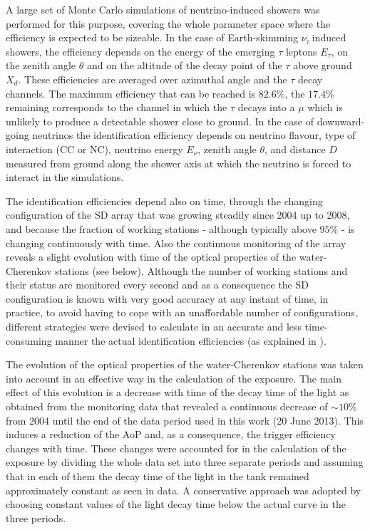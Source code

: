 \documentclass[reprint,showpacs,showkeys,amsmath,amssymb,aps,nofootinbib]{revtex4-1}
\def \nutau {$\nu_\tau~$}
\begin{document}
A large set of Monte Carlo simulations of neutrino-induced
showers was performed for this purpose, covering the whole
parameter space where the efficiency is expected to be sizeable.
In the case of Earth-skimming \nutau induced showers, 
the efficiency depends on the energy of the 
emerging $\tau$ leptons $E_\tau$, on the zenith angle $\theta$ and on the altitude of the
decay point of the $\tau$ above ground $X_d$. These efficiencies are averaged over azimuthal 
angle and the $\tau$ decay channels. 
The maximum efficiency that can be reached
is $82.6\%$, the $17.4\%$ remaining corresponds to the channel 
in which the $\tau$ decays into a $\mu$ which is unlikely to 
produce a detectable shower close to ground. 
In the case of downward-going neutrinos the identification efficiency
depends on neutrino flavour, type of interaction (CC or NC), neutrino 
energy $E_\nu$, zenith angle $\theta$, and distance $D$ measured
from ground along the shower axis at which the neutrino is forced to interact
in the simulations.

The identification efficiencies depend also on time, through the changing configuration 
of the SD array that was growing steadily since 2004 up to 2008, and because  
the fraction of working stations - although typically 
above $95\%$ - is changing continuously with time.
Also the continuous monitoring of the array reveals
a slight evolution with time of the optical properties of 
the water-Cherenkov stations (see below).  
Although the number of working stations and their status
are monitored every second and as a consequence the SD configuration
is known with very good accuracy at any instant of time,
in practice, to avoid having to cope with an unaffordable number of configurations,
different strategies were devised to calculate in an accurate and less time-consuming
manner the actual identification efficiencies (as explained in \cite{ES,DGH,DGL}). 

The evolution of the optical properties of the water-Cherenkov stations 
was taken into account in an effective way in the calculation of 
the exposure. The main effect of this evolution is a decrease with 
time of the decay time of the light as obtained from the monitoring
data that revealed a continuous decrease of  
$\sim 10\%$ from 2004 until 
the end of the data period used in this work (20 June 2013).  
This induces a reduction of the AoP and, as a consequence,
the trigger efficiency changes with time.
These changes were accounted for in the  
calculation of the exposure by dividing the whole data set 
into three separate periods and assuming that in each of them the decay 
time of the light in the tank remained approximately constant as seen in data. 
A conservative approach was adopted by choosing constant values 
of the light decay time below the actual curve in the three periods. 
\end{document}
